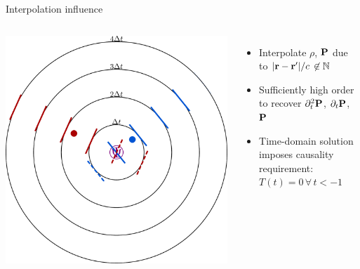 \documentclass[aspectratio=169]{beamer}
\begin{document}
\begin{frame}{Interpolation influence}
  \begin{columns}
      \begin{center}
        \includegraphics[height=0.85\textheight]{figures/spheres_of_influence}
      \end{center}

      \begin{itemize}
        \item Interpolate $\rho$, $\vb{P}$ due to $\abs{\vb{r} - \vb{r}'}/c \, \not \in \mathbb{N}$
        \item Sufficiently high order to recover $\partial_t^2 \vb{P}$, $\partial_t \vb{P}$, $\vb{P}$
        \item Time-domain solution imposes causality requirement: $T(t) = 0 \, \forall \, t < -1$
      \end{itemize}
  \end{columns}
\end{frame}
\end{document}
